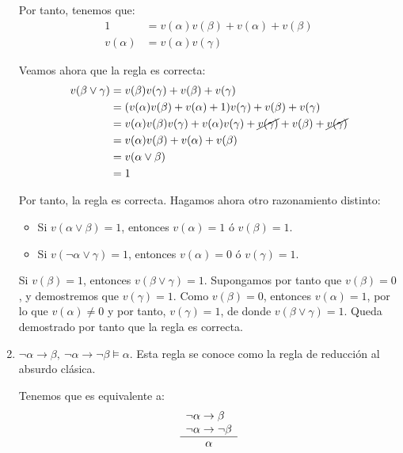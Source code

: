 \begin{ejercicio*}
\begin{enumerate}
        Por tanto, tenemos que:
        \begin{align*}
            1 &= v(\alpha)v(\beta)+v(\alpha)+v(\beta)\\
            v(\alpha) &= v(\alpha)v(\gamma)
        \end{align*}

        Veamos ahora que la regla es correcta:
        \begin{align*}
            v(\beta\lor\gamma)
            &= v(\beta)v(\gamma)+v(\beta)+v(\gamma)\\
            &= (v(\alpha)v(\beta)+v(\alpha)+1)v(\gamma) + v(\beta) + v(\gamma)\\
            &= v(\alpha)v(\beta)v(\gamma)+v(\alpha)v(\gamma)+\cancel{v(\gamma)} + v(\beta) + \cancel{v(\gamma)}\\
            &= v(\alpha)v(\beta)+v(\alpha)+ v(\beta)\\
            &= v(\alpha\lor \beta)\\
            &= 1
        \end{align*}

        Por tanto, la regla es correcta. Hagamos ahora otro razonamiento distinto:
        \begin{itemize}
            \item Si $v(\alpha\lor\beta)=1$, entonces $v(\alpha)=1$ ó $v(\beta)=1$. 

            \item Si $v(\lnot\alpha\lor\gamma)=1$, entonces $v(\alpha)=0$ ó $v(\gamma)=1$.
        \end{itemize}
                
        Si $v(\beta)=1$, entonces $v(\beta\lor\gamma)=1$.
        Supongamos por tanto que $v(\beta)=0$, y demostremos que $v(\gamma)=1$.
        Como $v(\beta)=0$, entonces $v(\alpha)=1$, por lo que $v(\alpha)\neq 0$ y por tanto, $v(\gamma)=1$, de donde $v(\beta\lor\gamma)=1$.
        Queda demostrado por tanto que la regla es correcta.

        \item $\lnot\alpha\rightarrow\beta,~\lnot\alpha\rightarrow\lnot\beta\models\alpha$. Esta regla se conoce como la regla de reducción al absurdo clásica.
        
        Tenemos que es equivalente a:
        \begin{equation*}
            \begin{array}{l}
                \lnot\alpha\rightarrow\beta\\
                \lnot\alpha\rightarrow\lnot\beta\\ \hline
                \multicolumn{1}{c}{\alpha}
            \end{array}
        \end{equation*}


\end{enumerate}
\end{ejercicio*}
